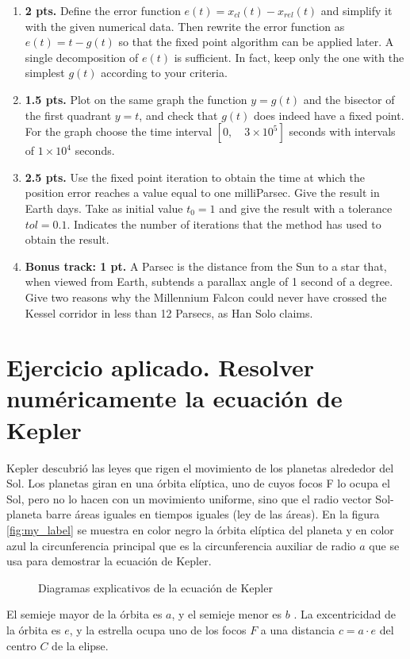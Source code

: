 \begin{enumerate}
\begin{enumerate}
	\item {\bf 2 pts.} Define the error function $e(t) = x_{cl}(t) - x_{rel}(t)$ and simplify it with the given numerical data. Then rewrite the error function as $e(t) = t - g(t)$ so that the fixed point algorithm can be applied later. A single decomposition of $e(t)$ is sufficient. In fact, keep only the one with the simplest $g(t)$ according to your criteria.
	\item {\bf 1.5 pts.} Plot on the same graph the function $y = g(t)$ and the bisector of the first quadrant $y = t$, and check that $g(t)$ does indeed have a fixed point. For the graph choose the time interval $[0, \quad 3 \times 10^5]$ seconds with intervals of $1\times 10^4$ seconds.
	\item {\bf 2.5 pts.} Use the fixed point iteration to obtain the time at which the position error reaches a value equal to one milliParsec. Give the result in Earth days. Take as initial value $t_0 = 1$ and give the result with a tolerance $tol = 0.1$. Indicates the number of iterations that the method has used to obtain the result.
	\item {\bf Bonus track: 1 pt.} A Parsec is the distance from the Sun to a star that, when viewed from Earth, subtends a parallax angle of 1 second of a degree. Give two reasons why the Millennium Falcon could never have crossed the Kessel corridor in less than 12 Parsecs, as Han Solo claims.

\end{enumerate}

\end{enumerate}



\section*{Ejercicio aplicado. Resolver numéricamente la ecuación de Kepler}
Kepler descubrió las leyes que rigen el movimiento de los planetas alrededor del Sol. Los planetas giran en una órbita elíptica, uno de cuyos focos F lo ocupa el Sol, pero no lo hacen con un movimiento uniforme, sino que el radio vector Sol-planeta barre áreas iguales en tiempos iguales (ley de las áreas).
En la figura \ref{fig:my_label} se muestra en color negro la órbita elíptica del planeta y en color azul la circunferencia principal que es la circunferencia auxiliar de radio $a$ que  se usa para demostrar la ecuación de Kepler.


\begin{figure}[h]
    \centering
    \caption{Diagramas explicativos de la ecuación de Kepler}
\end{figure}
El semieje mayor de la órbita es $a$, y el semieje menor es $b$ . La excentricidad de la órbita es $e$, y la estrella ocupa uno de los focos $F$ a una distancia $c = a\cdot e $ del centro $C$ de la elipse.

